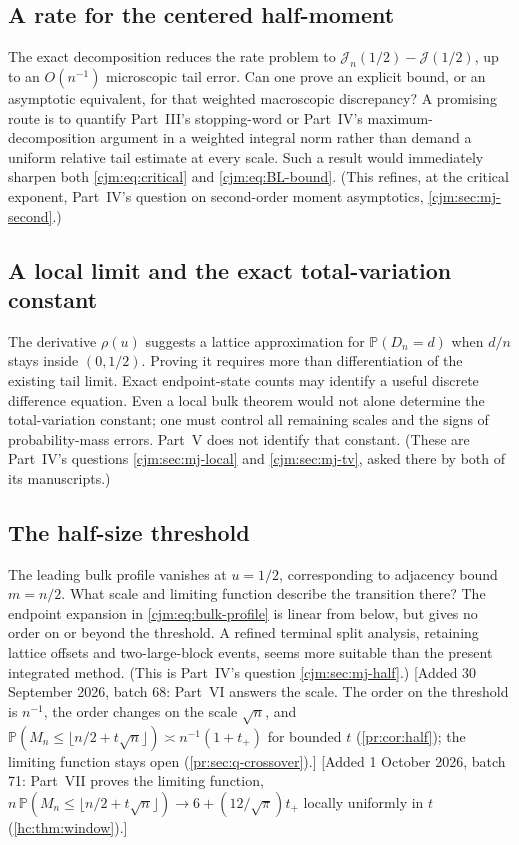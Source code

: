 \documentclass[11pt,a4paper]{article}
\theoremstyle{definition}\newaliascnt{definition}{theorem}
\theoremstyle{remark}\newaliascnt{remark}{theorem}
\newcommand{\ljP}{\mathbb P}
\begin{document}
\subsection{A rate for the centered half-moment}
The exact decomposition reduces the rate problem to
$\mathcal J_n(1/2)-\mathcal J(1/2)$, up to an $O(n^{-1})$ microscopic tail
error. Can one prove an explicit bound, or an asymptotic equivalent, for that
weighted macroscopic discrepancy? A promising route is to quantify Part~III's
stopping-word or Part~IV's maximum-decomposition argument in a weighted
integral norm rather than demand a uniform relative tail estimate at every
scale. Such a result would immediately sharpen both \eqref{cjm:eq:critical}
and \eqref{cjm:eq:BL-bound}. (This refines, at the critical exponent,
Part~IV's question on second-order moment asymptotics,
\cref{cjm:sec:mj-second}.)

\subsection{A local limit and the exact total-variation constant}
The derivative $\rho(u)$ suggests a lattice approximation for
$\ljP(D_n=d)$ when $d/n$ stays inside $(0,1/2)$. Proving it requires more
than differentiation of the existing tail limit. Exact endpoint-state
counts may identify a useful discrete difference equation. Even a local
bulk theorem would not alone determine the total-variation constant; one
must control all remaining scales and the signs of probability-mass
errors. Part~V does not identify that constant. (These are Part~IV's
questions \cref{cjm:sec:mj-local} and \cref{cjm:sec:mj-tv}, asked there
by both of its manuscripts.)

\subsection{The half-size threshold}
\label{pr:sec:cjm-half}
The leading bulk profile vanishes at $u=1/2$, corresponding to adjacency
bound $m=n/2$. What scale and limiting function describe the transition
there? The endpoint expansion in \eqref{cjm:eq:bulk-profile} is linear from
below, but gives no order on or beyond the threshold. A refined terminal
split analysis, retaining lattice offsets and two-large-block events,
seems more suitable than the present integrated method. (This is Part~IV's
question \cref{cjm:sec:mj-half}.)
[Added 30 September 2026, batch 68: Part~VI answers the scale. The order on
the threshold is $n^{-1}$, the order changes on the scale $\sqrt n$, and
$\ljP(M_n\le\lfloor n/2+t\sqrt n\rfloor)\asymp n^{-1}(1+t_+)$ for bounded $t$
(\cref{pr:cor:half}); the limiting function stays open
(\cref{pr:sec:q-crossover}).]
[Added 1 October 2026, batch 71: Part~VII proves the limiting function,
$n\,\ljP(M_n\le\lfloor n/2+t\sqrt n\rfloor)\to6+(12/\sqrt\pi)t_+$ locally
uniformly in $t$ (\cref{hc:thm:window}).]
\end{document}
